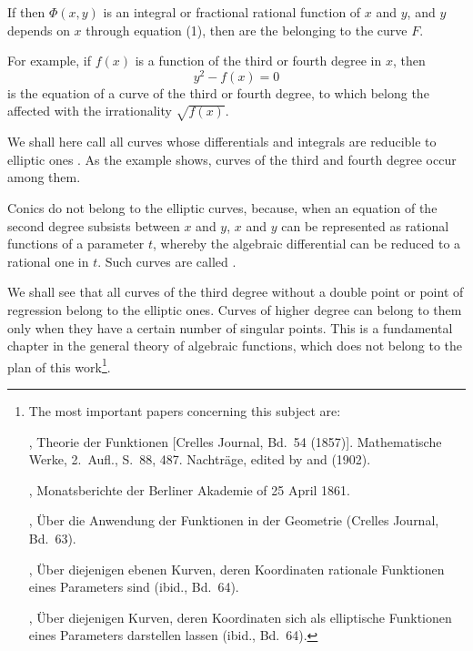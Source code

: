 
If then $\Phi(x,y)$ is an integral or fractional rational function
of $x$ and $y$, and $y$ depends on $x$ through equation (1), then
are the  belonging to the
curve $F$.

For example, if $f(x)$ is a function of the third or fourth degree
in $x$, then
\[ y^2 - f(x) = 0 \]
is the equation of a curve of the third or fourth degree, to which
belong the  affected with the
irrationality $\sqrt{f(x)}$.

We shall here call all curves whose differentials and integrals
are reducible to elliptic ones . As the
example shows, curves of the third and fourth degree occur among
them.

Conics do not belong to the elliptic curves, because, when an
equation of the second degree subsists between $x$ and $y$, $x$
and $y$ can be represented as rational functions of a parameter
$t$, whereby the algebraic differential can be reduced to a
rational one in $t$. Such curves are called .

We shall see that all curves of the third degree without a double
point or point of regression belong to the elliptic ones. Curves
of higher degree can belong to them only when they have a certain
number of singular points. This is a fundamental chapter in the
general theory of algebraic functions, which does not belong to
the plan of this work\footnote{The most important papers
concerning this subject are:

, Theorie der  Funktionen [Crelles
Journal, Bd.\ 54 (1857)]. Mathematische Werke, 2.\ Aufl., S.\ 88,
487. Nachträge, edited by  and
 (1902).

, Monatsberichte der Berliner Akademie of
25 April 1861.

, Über die Anwendung der  Funktionen
in der Geometrie (Crelles Journal, Bd.\ 63).

, Über diejenigen ebenen Kurven, deren
Koordinaten rationale Funktionen eines Parameters sind (ibid.,
Bd.\ 64).

, Über diejenigen Kurven, deren Koordinaten
sich als elliptische Funktionen eines Parameters darstellen
lassen (ibid., Bd.\ 64).}.
